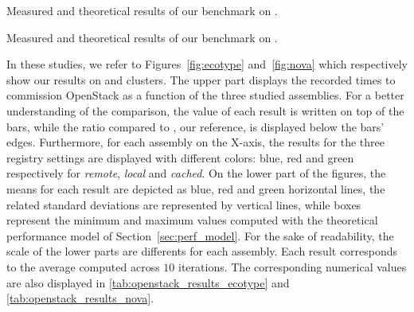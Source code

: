 \begin{table}
    \begin{center}
        
        \caption{Measured and theoretical results of our benchmark on \ecotype.}
        \label{tab:openstack_results_ecotype}
    \end{center}
\end{table}

\begin{table}
    \begin{center}
        
        \caption{Measured and theoretical results of our benchmark on \nova.}
        \label{tab:openstack_results_nova}
    \end{center}
\end{table}


In these studies, we refer to Figures~\ref{fig:ecotype}
and~\ref{fig:nova} which respectively show our results on \ecotype and
\nova clusters. The upper part displays the recorded times to
commission OpenStack as a function of the three studied assemblies.
For a better understanding of the comparison, the value of
each result is written on top of the bars, while the ratio compared to
\ansass, our reference, is displayed below the bars' edges.
Furthermore, for each assembly on the X-axis, the results for the
three \docker registry settings are displayed with different colors:
blue, red and green respectively for \emph{remote}, \emph{local} and
\emph{cached}. On the lower part of the figures, the means for each
result are depicted as blue, red and green horizontal lines, the
related standard deviations are represented by vertical lines, while
boxes represent the minimum and maximum values computed with the
theoretical performance model of Section~\ref{sec:perf_model}.
% 
For the sake of readability, the scale of the lower parts are
differents for each assembly. Each result corresponds to the average
computed across $10$ iterations. The corresponding numerical values are
also displayed in \cref{tab:openstack_results_ecotype} and \cref{tab:openstack_results_nova}.
%


